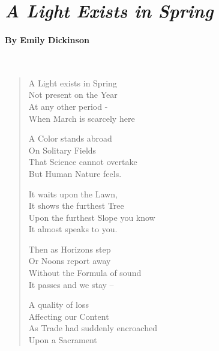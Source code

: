\documentclass[11pt, letterpaper]{memoir}
\begin{document}
\section*{\emph{A Light Exists in Spring}}
\paragraph{By Emily Dickinson}~
\begin{verse}
  A Light exists in Spring\\
  Not present on the Year\\
  At any other period -\\
  When March is scarcely here

  A Color stands abroad\\
  On Solitary Fields\\
  That Science cannot overtake\\
  But Human Nature feels.

  It waits upon the Lawn,\\
  It shows the furthest Tree\\
  Upon the furthest Slope you know\\
  It almost speaks to you.

  Then as Horizons step\\
  Or Noons report away\\
  Without the Formula of sound\\
  It passes and we stay --

  A quality of loss\\
  Affecting our Content\\
  As Trade had suddenly encroached\\
  Upon a Sacrament
\end{verse}
\end{document}
